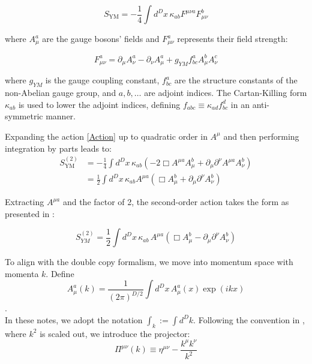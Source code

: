 \documentclass[13pt]{article}
\begin{document}
\begin{equation}
S_\text{YM} = -\frac{1}{4} \int d^Dx \, \kappa_{ab} F^{\mu \nu a} F_{\mu \nu}^{b} \tag{6}
\label{Action}
\end{equation}


where \(A_{\mu}^{a}\) are the gauge bosons' fields and \(F_{\mu \nu}^{a}\) represents their field strength:

\begin{equation}
F_{\mu \nu}^{a} = \partial_{\mu} A^{a}_{\nu} - \partial_{\nu}A^{a}_{\mu} + g_{YM} f^{a}_{bc}A_{\mu}^{b} A_{\nu}^{c} \tag{7}
\end{equation}


where \(g_{YM}\) is the gauge coupling constant, \(f^{a}_{bc}\) are the structure constants of the non-Abelian gauge group, and \(a, b, \ldots\) are adjoint indices. The Cartan-Killing form \(\kappa_{ab}\) is used to lower the adjoint indices, defining \(f_{abc} \equiv \kappa_{ad}f^d_{bc}\) in an anti-symmetric manner.

Expanding the action \eqref{Action} up to quadratic order in \(A^{\mu}\) and then performing integration by parts leads to:
\begin{align}
S_\text{YM}^{(2)} &=-\frac{1}{4} \int d^{D}x \, \kappa_{ab} \left(-2 \Box A^{\mu a} A_{\mu}^{b} + \partial_{\mu}\partial^{\nu} A^{\mu a}A_{\nu}^b\right) \nonumber \\
&=\frac{1}{2} \int d^{D}x \, \kappa_{ab}A^{\mu a} \left(\Box A_{\mu}^{b} + \partial_{\mu}\partial^{\nu} A_{\nu}^b\right)
\tag{8}
\end{align}

Extracting \(A^{\mu a}\) and the factor of 2, the second-order action takes the form as presented in \cite{D_az_Jaramillo_2022}:

\[S_{YM}^{(2)} = \frac{1}{2} \int d^{D}x \, \kappa_{ab} \, A^{\mu a}(\Box A^{b}_{\mu} - \partial_{\mu} \partial^{\nu} A^b_{\nu}) \tag{9}\]

To align with the double copy formalism, we move into momentum space with momenta \(k\). Define $$A^{a}_{\mu}(k) = \frac{1}{(2\pi)^{D/2}} \int d^D x \, A_{\mu}^{a}(x) \exp(ikx)$$. \\
In these notes, we adopt the notation \(\int_k := \int d^{D} k\). Following the convention in \cite{D_az_Jaramillo_2022}, where \(k^2\) is scaled out, we introduce the projector:
\begin{equation}
    \Pi^{\mu \nu}(k) \equiv \eta^{\mu \nu} - \frac{k^{\mu} k^{\nu}}{k^2} \tag{10}
    \label{prop1}
\end{equation}
\end{document}
